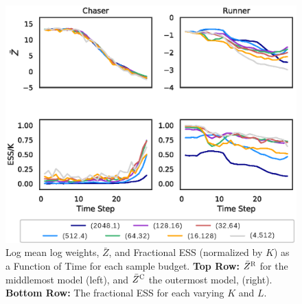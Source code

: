 \documentclass[twoside]{article}
\begin{document}




\begin{figure}[!t]
\begin{center}
\centerline{\hspace{-0.2em}\includegraphics[width=1.05\columnwidth]{PLOT_A_4Part.eps}}
\caption{ Log mean log weights, $\bar{Z}$, and Fractional ESS (normalized by $K$) as a Function of Time for each sample budget. \textbf{Top Row:}  $\bar{Z}^\textsc{R}$ for the middlemost model (left), and $\bar{Z}^\textsc{C}$ the outermost model, (right). \textbf{Bottom Row:} The fractional ESS for each varying $K$ and $L$.  }
\label{fig:log_means}
\end{center}
\vskip -0.4in
\end{figure} 

\end{document}
